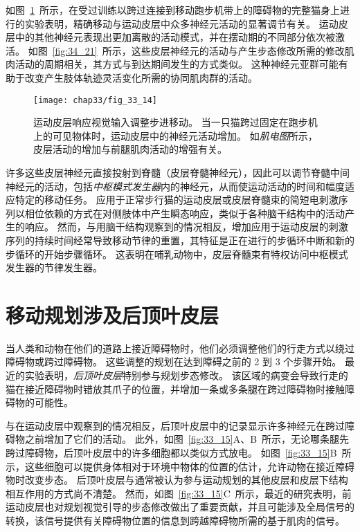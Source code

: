 如图~\ref{fig:33_14}~所示，在受过训练以跨过连接到移动跑步机带上的障碍物的完整猫身上进行的实验表明，精确移动与运动皮层中众多神经元活动的显著调节有关。
运动皮层中的其他神经元表现出更加离散的活动模式，并在摆动期的不同部分依次被激活。
如图~\ref{fig:34_21}~所示，这些皮层神经元的活动与产生步态修改所需的修改肌肉活动的周期相关，其方式与到达期间发生的方式类似。
这种神经元亚群可能有助于改变产生肢体轨迹灵活变化所需的协同肌肉群的活动。


\begin{figure}[htbp]
	\centering
	\texttt{[image: chap33/fig\_33\_14]}
	\caption{运动皮层响应视觉输入调整步进移动。
		当一只猫跨过固定在跑步机上的可见物体时，运动皮层中的神经元活动增加。
		如\textit{肌电图}所示，皮层活动的增加与前腿肌肉活动的增强有关\cite{drew1988motor}。}
	\label{fig:33_14}
\end{figure}


许多这些皮层神经元直接投射到脊髓（皮层脊髓神经元），因此可以调节脊髓中间神经元的活动，包括\textit{中枢模式发生器}内的神经元，从而使运动活动的时间和幅度适应特定的移动任务。
应用于正常步行猫的运动皮层或皮层脊髓束的简短电刺激序列以相位依赖的方式在对侧肢体中产生瞬态响应，类似于各种脑干结构中的活动产生的响应。
然而，与用脑干结构观察到的情况相反，增加应用于运动皮层的刺激序列的持续时间经常导致移动节律的重置，其特征是正在进行的步循环中断和新的步循环的开始步骤循环。
这表明在哺乳动物中，皮层脊髓束有特权访问中枢模式发生器的节律发生器。



\section{移动规划涉及后顶叶皮层}

当人类和动物在他们的道路上接近障碍物时，他们必须调整他们的行走方式以绕过障碍物或跨过障碍物。
这些调整的规划在达到障碍之前的 2 到 3 个步骤开始。
最近的实验表明，\textit{后顶叶皮层}特别参与规划步态修改。
该区域的病变会导致行走的猫在接近障碍物时错放其爪子的位置，并增加一条或多条腿在跨过障碍物时接触障碍物的可能性。


与在运动皮层中观察到的情况相反，后顶叶皮层中的记录显示许多神经元在跨过障碍物之前增加了它们的活动。
此外，如图~\ref{fig:33_15}A、B~所示，无论哪条腿先跨过障碍物，后顶叶皮层中的许多细胞都以类似方式放电。
如图~\ref{fig:33_15}B~所示，这些细胞可以提供身体相对于环境中物体的位置的估计，允许动物在接近障碍物时改变步态。
后顶叶皮层与通常被认为参与运动规划的其他皮层和皮层下结构相互作用的方式尚不清楚。
然而，如图~\ref{fig:33_15}C~所示，最近的研究表明，前运动皮层也对规划视觉引导的步态修改做出了重要贡献，并且可能涉及全局信号的转换，该信号提供有关障碍物位置的信息到跨越障碍物所需的基于肌肉的信号。


